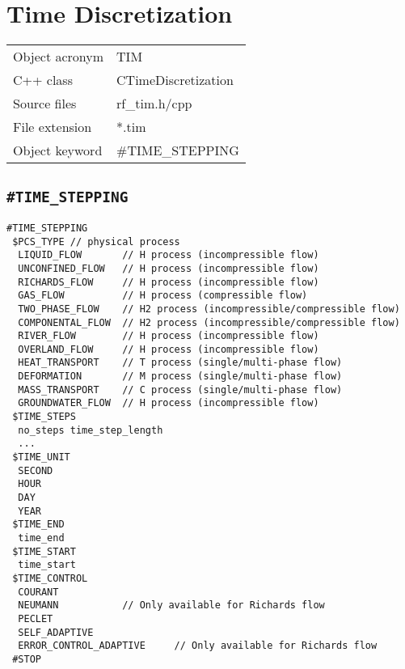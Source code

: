 \section{Time Discretization}

\begin{tabular*}{8.35cm}{|p{2.5cm}|p{5cm}|} \hline
Object acronym & TIM \\
C++ class      & CTimeDiscretization \\
Source files   & rf\_tim.h/cpp \\
\hline
File extension & *.tim \\
Object keyword & \#TIME\_STEPPING \\
\hline
\end{tabular*}


\subsection{\texttt{\bf\#TIME\_STEPPING}}


\begin{verbatim}
#TIME_STEPPING
 $PCS_TYPE // physical process
  LIQUID_FLOW       // H process (incompressible flow)
  UNCONFINED_FLOW   // H process (incompressible flow)
  RICHARDS_FLOW     // H process (incompressible flow)
  GAS_FLOW          // H process (compressible flow)
  TWO_PHASE_FLOW    // H2 process (incompressible/compressible flow)
  COMPONENTAL_FLOW  // H2 process (incompressible/compressible flow)
  RIVER_FLOW        // H process (incompressible flow)
  OVERLAND_FLOW     // H process (incompressible flow)
  HEAT_TRANSPORT    // T process (single/multi-phase flow)
  DEFORMATION       // M process (single/multi-phase flow)
  MASS_TRANSPORT    // C process (single/multi-phase flow)
  GROUNDWATER_FLOW  // H process (incompressible flow)
 $TIME_STEPS
  no_steps time_step_length
  ...
 $TIME_UNIT
  SECOND
  HOUR
  DAY
  YEAR
 $TIME_END
  time_end
 $TIME_START
  time_start
 $TIME_CONTROL
  COURANT
  NEUMANN           // Only available for Richards flow
  PECLET
  SELF_ADAPTIVE
  ERROR_CONTROL_ADAPTIVE     // Only available for Richards flow
 #STOP
\end{verbatim}


